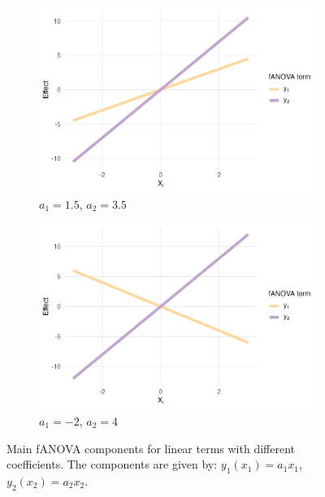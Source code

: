 \begin{figure}[htpb]
    \centering
    \begin{subfigure}[t]{0.49\textwidth}
        \centering
        \includegraphics[width=\textwidth]{images/experiment_section/linear_a1p15_a2p35_a11p00_a22p00_a12p00_rhop00_main.png}
        \caption{$a_1 = 1.5$, $a_2 = 3.5$}
    \end{subfigure}%
    \hfill
    \begin{subfigure}[t]{0.49\textwidth}
        \centering
        \includegraphics[width=\textwidth]{images/experiment_section/linear_a1m20_a2p40_a11p00_a22p00_a12p00_rhop00_main.png}
        \caption{$a_1 = -2$, $a_2 = 4$}
    \end{subfigure}
    \caption{Main fANOVA components for linear terms with different coefficients. The components are given by: $y_1(x_1) = a_1 x_1$, $y_2(x_2) = a_2 x_2$.}
    \label{fig:linear_main_effects}
\end{figure}



